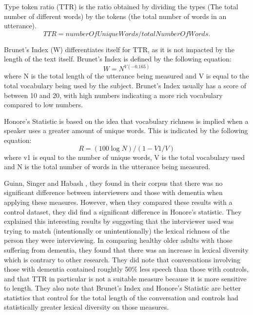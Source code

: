\documentclass[12pt]{article}
\begin{document}
Type token ratio (TTR) is the ratio obtained by dividing the types (The total number of different words) by the tokens (the total number of words in an utterance).
\begin{equation} \label{x1}
TTR = numberOfUniqueWords / totalNumberOfWords.
\end{equation}
\par 
Brunet's Index (W) differentiates itself for TTR, as it is not impacted by the length of the text itself. Brunet's Index is defined by the following equation:
\begin{equation} \label{x2}
W = N^{V(-0.165)}
\end{equation}
where N is the total length of the utterance being measured and V is equal to the total vocabulary being used by the subject. Brunet's Index usually has a score of between 10 and 20, with high numbers indicating a more rich vocabulary compared to low numbers. \newline
\par 
Honore's Statistic is based on the idea that vocabulary richness is implied when a speaker uses a greater amount of unique words. This is indicated by the following equation: 
\begin{equation} \label{x3}
R = (100 \log N) / (1 - V1/V)
\end{equation}
where v1 is equal to the number of unique words, V is the total vocabulary used and N is the total number of words in the utterance being measured.
\par 
Guinn, Singer and Habash \cite{Guinn2015}, they found in their corpus that there was no significant difference between interviewers and those with dementia when applying these measures. However, when they compared these results with a control dataset, they did find a significant difference in Honore's statistic. They explained this interesting results by suggesting that the interviewer used was trying to match (intentionally or unintentionally) the lexical richness of the person they were interviewing. In comparing healthy older adults with those suffering from dementia, they found that there was an increase in lexical diversity which is contrary to other research. They did note that conversations involving those with dementia contained roughtly 50\% less speech than those with controls, and that TTR in particular is not a suitable measure because it is more sensitive to length. They also note that Brunet's Index and Honore's Statistic are better statistics that control for the total length of the conversation and controls had statistically greater lexical diversity on those measures. 
\end{document}
